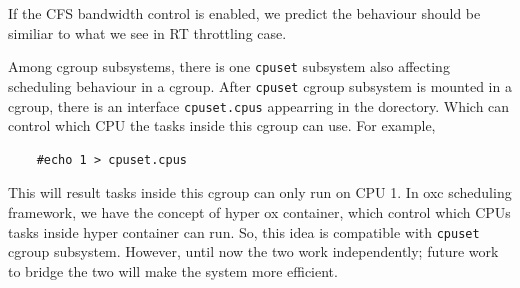 If the CFS bandwidth control is enabled, we predict the behaviour
should be similiar to what we see in RT throttling case.

Among cgroup subsystems, there is one \texttt{cpuset} subsystem also 
affecting scheduling behaviour in a cgroup.
After \texttt{cpuset} cgroup subsystem is mounted in a cgroup, there is an 
interface \texttt{cpuset.cpus} appearring in the dorectory. Which can control
which CPU the tasks inside this cgroup can use.
For example, 
\begin{lstlisting}
	#echo 1 > cpuset.cpus
\end{lstlisting}
This will result tasks inside this cgroup can only run on CPU 1.
In oxc scheduling framework, we have the concept of hyper ox container, which 
control which CPUs tasks inside hyper container can run. So, this idea is
compatible with \texttt{cpuset} cgroup subsystem. However, until now the two
work independently; future work to bridge the two will make the system more
efficient.
